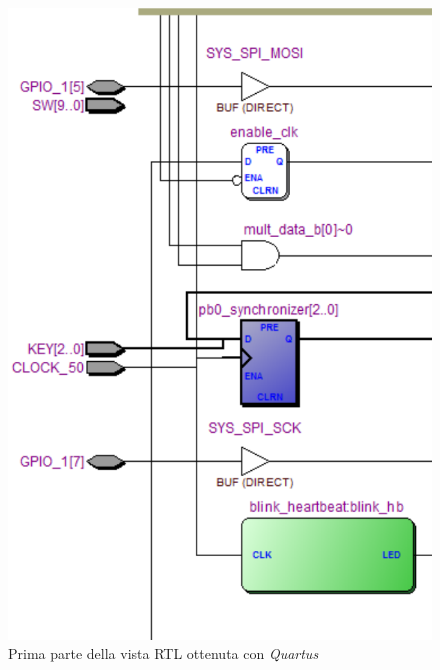 \documentclass[titlepage]{report}
\begin{document}
			\begin{figure}[H]
				\centering
				\includegraphics[scale=0.4]{./img/quartus_rtl_viewer_1.png}
				\caption{Prima parte della vista RTL ottenuta con \textit{Quartus}}
				\label{fig:rtl_quartus_1}
			\end{figure}	
\end{document}
